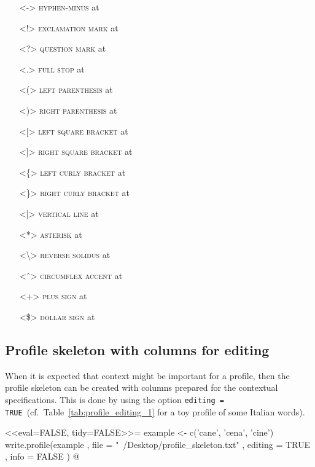 \begin{itemize}
  
  \item[] <-> \textsc{hyphen-minus} at 
  \item[] <!> \textsc{exclamation mark} at 
  \item[] <?> \textsc{question mark} at 
  \item[] <.> \textsc{full stop} at 
  \item[] <(> \textsc{left parenthesis} at 
  \item[] <)> \textsc{right parenthesis} at 
  \item[] <[> \textsc{left square bracket} at 
  \item[] <]> \textsc{right square bracket} at 
  \item[] <\{> \textsc{left curly bracket} at 
  \item[] <\}> \textsc{right curly bracket} at 
  \item[] <|> \textsc{vertical line} at 
  \item[] <*> \textsc{asterisk} at 
  \item[] <\backslash> \textsc{reverse solidus} at 
  \item[] <ˆ> \textsc{circumflex accent} at 
  \item[] <+> \textsc{plus sign} at 
  \item[] <\$> \textsc{dollar sign} at 
  
\end{itemize}

\subsection*{Profile skeleton with columns for editing}
\label{profile-editing}

When it is expected that context might be important for a profile, then the
profile skeleton can be created with columns prepared for the contextual
specifications. This is done by using the option \texttt{editing = TRUE}~(cf.\
Table~\ref{tab:profile_editing_1} for a toy profile of some Italian words).

<<eval=FALSE, tidy=FALSE>>=
example <- c('cane', 'cena', 'cine')
write.profile(example
              , file = "~/Desktop/profile_skeleton.txt"
              , editing = TRUE
              , info = FALSE
              )
@

